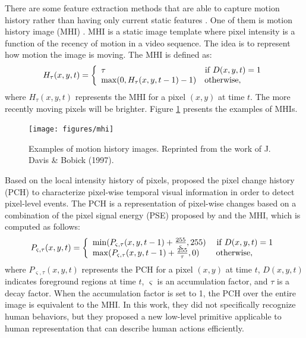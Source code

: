 There are some feature extraction methods that are able to capture
motion history rather than having only current static
features . One of them is
motion history image (MHI) . MHI is a static
image template where pixel intensity is a function of the recency of
motion in a video sequence. The idea is to represent how motion the
image is moving. The MHI is defined as:
\[
  H_\tau  (x,y,t) = \left\{ \begin{array}{l}
  \tau \quad \quad \quad \quad \quad \quad \quad \quad \quad \quad \quad \quad 
  {\rm if}\;D(x,y,t) = 1 \\ 
  \max (0,H_\tau  (x,y,t - 1) - 1)\quad {\rm otherwise}, \\ 
  \end{array} \right.
\]
where $H_\tau (x,y,t)$ represents the MHI for a pixel $(x,y)$ at time
$t$. The more recently moving pixels will be
brighter. Figure \ref{fig:mhi} presents the examples of MHIs.

\begin{figure}[t]
  \centering
  \texttt{[image: figures/mhi]}
  \caption[Examples of motion history images]{Examples of motion
  history images. Reprinted from the work of J. Davis \& Bobick
  (1997).}
  \label{fig:mhi}
\end{figure}

Based on the local intensity history of
pixels,  proposed the pixel change history
(PCH) to characterize pixel-wise temporal visual information in order
to detect pixel-level events. The PCH is a representation of
pixel-wise changes based on a combination of the pixel signal energy
(PSE) proposed by  and the MHI, which is
computed as follows:
\[
  P_{\varsigma ,\tau } (x,y,t) = \left\{ \begin{array}{l}
  \min (P_{\varsigma ,\tau } (x,y,t - 1) + \frac{{255}}{\varsigma },255)\quad 
  \; {\rm if}\;D(x,y,t) = 1 \\ 
  \max (P_{\varsigma ,\tau } (x,y,t - 1) + \frac{{255}}{\tau },0)\quad \quad 
  {\rm otherwise}, \\ 
  \end{array} \right.
\]
where $P_{\varsigma ,\tau } (x,y,t)$ represents the PCH for a pixel
$(x,y)$ at time $t$, $D(x,y,t)$ indicates foreground regions at time
$t$, $\varsigma$ is an accumulation factor, and $\tau$ is a decay
factor. When the accumulation factor is set to 1, the PCH over the
entire image is equivalent to the MHI. In this work, they did not
specifically recognize human behaviors, but they proposed a new
low-level primitive applicable to human representation that can
describe human actions efficiently.

